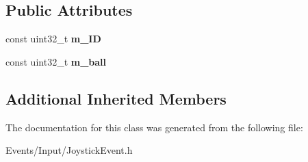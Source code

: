 \subsection*{Public Attributes}
\begin{DoxyCompactItemize}
\item 
\mbox{\label{classJoystickBallEvent_a974e5ffdf7abb9900d936b24000ac635}} 
const uint32\+\_\+t {\bfseries m\+\_\+\+ID}
\item 
\mbox{\label{classJoystickBallEvent_a0ee95c2e7868d14239e268c36d1bf721}} 
const uint32\+\_\+t {\bfseries m\+\_\+ball}
\end{DoxyCompactItemize}
\subsection*{Additional Inherited Members}


The documentation for this class was generated from the following file\+:\begin{DoxyCompactItemize}
\item 
Events/\+Input/Joystick\+Event.\+h\end{DoxyCompactItemize}
